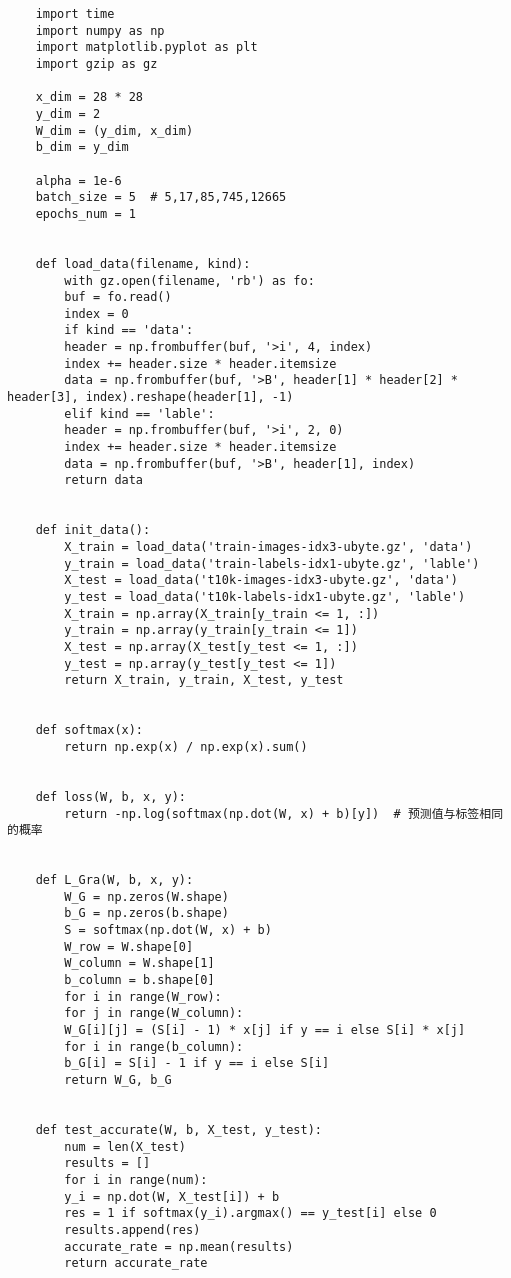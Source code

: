 \documentclass[lang=cn,12pt,a4paper,cite=authoryear]{elegantpaper}
\begin{document}
\begin{lstlisting}
	import time
	import numpy as np
	import matplotlib.pyplot as plt
	import gzip as gz
	
	x_dim = 28 * 28
	y_dim = 2
	W_dim = (y_dim, x_dim)
	b_dim = y_dim
	
	alpha = 1e-6
	batch_size = 5  # 5,17,85,745,12665
	epochs_num = 1
	
	
	def load_data(filename, kind):
		with gz.open(filename, 'rb') as fo:
		buf = fo.read()
		index = 0
		if kind == 'data':
		header = np.frombuffer(buf, '>i', 4, index)
		index += header.size * header.itemsize
		data = np.frombuffer(buf, '>B', header[1] * header[2] * header[3], index).reshape(header[1], -1)
		elif kind == 'lable':
		header = np.frombuffer(buf, '>i', 2, 0)
		index += header.size * header.itemsize
		data = np.frombuffer(buf, '>B', header[1], index)
		return data
	
	
	def init_data():
		X_train = load_data('train-images-idx3-ubyte.gz', 'data')
		y_train = load_data('train-labels-idx1-ubyte.gz', 'lable')
		X_test = load_data('t10k-images-idx3-ubyte.gz', 'data')
		y_test = load_data('t10k-labels-idx1-ubyte.gz', 'lable')
		X_train = np.array(X_train[y_train <= 1, :])
		y_train = np.array(y_train[y_train <= 1])
		X_test = np.array(X_test[y_test <= 1, :])
		y_test = np.array(y_test[y_test <= 1])
		return X_train, y_train, X_test, y_test
	
	
	def softmax(x):
		return np.exp(x) / np.exp(x).sum()
	
	
	def loss(W, b, x, y):
		return -np.log(softmax(np.dot(W, x) + b)[y])  # 预测值与标签相同的概率
	
	
	def L_Gra(W, b, x, y):
		W_G = np.zeros(W.shape)
		b_G = np.zeros(b.shape)
		S = softmax(np.dot(W, x) + b)
		W_row = W.shape[0]
		W_column = W.shape[1]
		b_column = b.shape[0]
		for i in range(W_row):
		for j in range(W_column):
		W_G[i][j] = (S[i] - 1) * x[j] if y == i else S[i] * x[j]
		for i in range(b_column):
		b_G[i] = S[i] - 1 if y == i else S[i]
		return W_G, b_G
	
	
	def test_accurate(W, b, X_test, y_test):
		num = len(X_test)
		results = []
		for i in range(num):
		y_i = np.dot(W, X_test[i]) + b
		res = 1 if softmax(y_i).argmax() == y_test[i] else 0
		results.append(res)
		accurate_rate = np.mean(results)
		return accurate_rate
	

\end{lstlisting}
\end{document}
